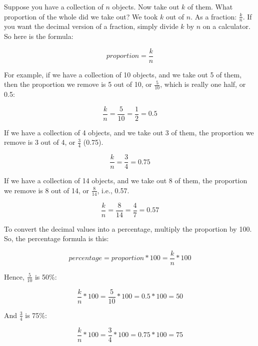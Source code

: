 \documentclass[../../../main.tex]{subfiles}
\begin{document}
\noindent
Suppose you have a collection of $n$ objects. Now take out $k$ of them. What proportion of the whole did we take out? We took $k$ out of $n$. As a fraction: $\frac{k}{n}$. If you want the decimal version of a fraction, simply divide $k$ by $n$ on a calculator. So here is the formula:

\begin{equation*}
  proportion = \frac{k}{n}
\end{equation*}

\noindent
For example, if we have a collection of 10 objects, and we take out 5 of them, then the proportion we remove is 5 out of 10, or $\frac{5}{10}$, which is really one half, or 0.5:

\begin{equation*}
  \frac{k}{n} = \frac{5}{10} = \frac{1}{2} = 0.5
\end{equation*}

\noindent
If we have a collection of 4 objects, and we take out 3 of them, the proportion we remove is 3 out of 4, or $\frac{3}{4}$ (0.75). 

\begin{equation*}
  \frac{k}{n} = \frac{3}{4} = 0.75
\end{equation*}

\noindent
If we have a collection of 14 objects, and we take out 8 of them, the proportion we remove is 8 out of 14, or $\frac{8}{14}$, i.e., 0.57.

\begin{equation*}
  \frac{k}{n} = \frac{8}{14} = \frac{4}{7} = 0.57
\end{equation*}

\noindent
To convert the decimal values into a percentage, multiply the proportion by 100. So, the percentage formula is this:

\begin{equation*}
  percentage = proportion * 100 = \frac{k}{n} * 100
\end{equation*}

\noindent
Hence, $\frac{5}{10}$ is 50\%:

\begin{equation*}
  \frac{k}{n} * 100 = \frac{5}{10} * 100 = 0.5 * 100 = 50
\end{equation*}

\noindent
And $\frac{3}{4}$ is 75\%:

\begin{equation*}
  \frac{k}{n} * 100 = \frac{3}{4} * 100 = 0.75 * 100 = 75
\end{equation*}
\end{document}
